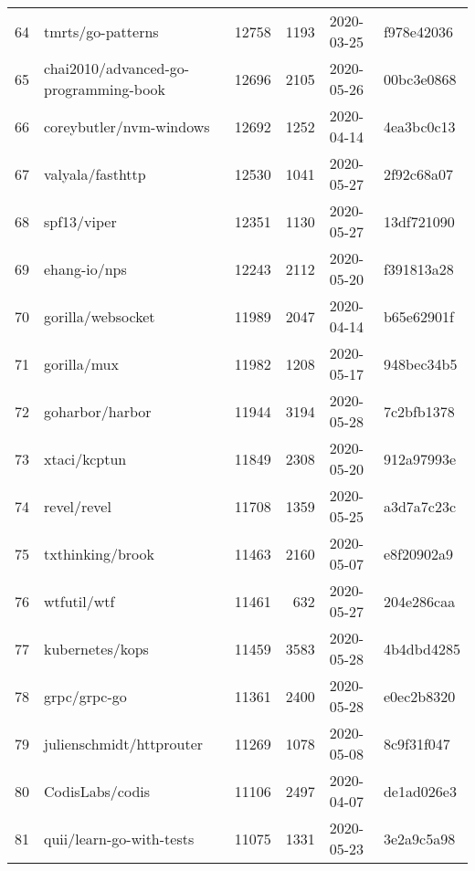 \begin{longtable}{llrrll}
    64  &                                  tmrts/go-patterns &  12758 &   1193 & 2020-03-25 &  f978e42036 \\
    65  &              chai2010/advanced-go-programming-book &  12696 &   2105 & 2020-05-26 &  00bc3e0868 \\
    66  &                            coreybutler/nvm-windows &  12692 &   1252 & 2020-04-14 &  4ea3bc0c13 \\
    67  &                                   valyala/fasthttp &  12530 &   1041 & 2020-05-27 &  2f92c68a07 \\
    68  &                                        spf13/viper &  12351 &   1130 & 2020-05-27 &  13df721090 \\
    69  &                                       ehang-io/nps &  12243 &   2112 & 2020-05-20 &  f391813a28 \\
    70  &                                  gorilla/websocket &  11989 &   2047 & 2020-04-14 &  b65e62901f \\
    71  &                                        gorilla/mux &  11982 &   1208 & 2020-05-17 &  948bec34b5 \\
    72  &                                    goharbor/harbor &  11944 &   3194 & 2020-05-28 &  7c2bfb1378 \\
    73  &                                       xtaci/kcptun &  11849 &   2308 & 2020-05-20 &  912a97993e \\
    74  &                                        revel/revel &  11708 &   1359 & 2020-05-25 &  a3d7a7c23c \\
    75  &                                   txthinking/brook &  11463 &   2160 & 2020-05-07 &  e8f20902a9 \\
    76  &                                        wtfutil/wtf &  11461 &    632 & 2020-05-27 &  204e286caa \\
    77  &                                    kubernetes/kops &  11459 &   3583 & 2020-05-28 &  4b4dbd4285 \\
    78  &                                       grpc/grpc-go &  11361 &   2400 & 2020-05-28 &  e0ec2b8320 \\
    79  &                           julienschmidt/httprouter &  11269 &   1078 & 2020-05-08 &  8c9f31f047 \\
    80  &                                    CodisLabs/codis &  11106 &   2497 & 2020-04-07 &  de1ad026e3 \\
    81  &                           quii/learn-go-with-tests &  11075 &   1331 & 2020-05-23 &  3e2a9c5a98 \\

\end{longtable}

